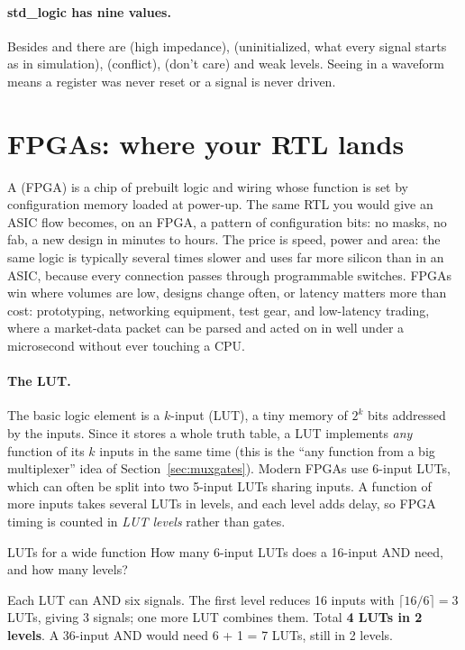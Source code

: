 \paragraph{std\_logic has nine values.} Besides  and  there are  (high impedance),  (uninitialized, what every signal starts as in simulation),  (conflict),  (don't care) and weak levels. Seeing  in a waveform means a register was never reset or a signal is never driven.

\section{FPGAs: where your RTL lands}
\label{sec:fpga}

A  (FPGA) is a chip of prebuilt logic and wiring whose function is set by configuration memory loaded at power-up. The same RTL you would give an ASIC flow becomes, on an FPGA, a pattern of configuration bits: no masks, no fab, a new design in minutes to hours. The price is speed, power and area: the same logic is typically several times slower and uses far more silicon than in an ASIC, because every connection passes through programmable switches. FPGAs win where volumes are low, designs change often, or latency matters more than cost: prototyping, networking equipment, test gear, and low-latency trading, where a market-data packet can be parsed and acted on in well under a microsecond without ever touching a CPU.

\paragraph{The LUT.} The basic logic element is a $k$-input  (LUT), a tiny memory of $2^k$ bits addressed by the inputs. Since it stores a whole truth table, a LUT implements \emph{any} function of its $k$ inputs in the same time (this is the ``any function from a big multiplexer'' idea of Section~\ref{sec:muxgates}). Modern FPGAs use 6-input LUTs, which can often be split into two 5-input LUTs sharing inputs. A function of more inputs takes several LUTs in levels, and each level adds delay, so FPGA timing is counted in \emph{LUT levels} rather than gates.

\begin{worked}{LUTs for a wide function}
How many 6-input LUTs does a 16-input AND need, and how many levels?

Each LUT can AND six signals. The first level reduces 16 inputs with $\lceil 16/6 \rceil = 3$ LUTs, giving 3 signals; one more LUT combines them. Total \textbf{4 LUTs in 2 levels}. A 36-input AND would need 6 + 1 = 7 LUTs, still in 2 levels.
\end{worked}

